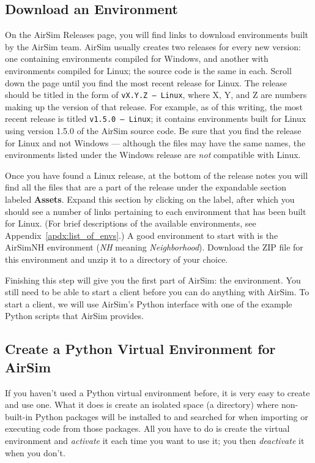 \subsection{Download an Environment}
On the AirSim Releases page, you will find links to download environments built by the AirSim team. AirSim usually creates two releases for every new version: one containing environments compiled for Windows, and another with environments compiled for Linux; the source code is the same in each. Scroll down the page until you find the most recent release for Linux. The release should be titled in the form of \texttt{vX.Y.Z --- Linux}, where X, Y, and Z are numbers making up the version of that release. For example, as of this writing, the most recent release is titled \texttt{v1.5.0 --- Linux}; it contains environments built for Linux using version 1.5.0 of the AirSim source code. Be sure that you find the release for Linux and not Windows --- although the files may have the same names, the environments listed under the Windows release are \textit{not} compatible with Linux.

Once you have found a Linux release, at the bottom of the release notes you will find all the files that are a part of the release under the expandable section labeled \textbf{Assets}. Expand this section by clicking on the label, after which you should see a number of links pertaining to each environment that has been built for Linux. (For brief descriptions of the available environments, see Appendix~\ref{apdx:list_of_envs}.) A good environment to start with is the AirSimNH environment (\textit{NH} meaning \textit{Neighborhood}). Download the ZIP file for this environment and unzip it to a directory of your choice.

Finishing this step will give you the first part of AirSim: the environment. You still need to be able to start a client before you can do anything with AirSim. To start a client, we will use AirSim's Python interface with one of the example Python scripts that AirSim provides.

\subsection{Create a Python Virtual Environment for AirSim}\label{sec:virtual_env}
If you haven't used a Python virtual environment before, it is very easy to create and use one. What it does is create an isolated space (a directory) where non-built-in Python packages will be installed to and searched for when importing or executing code from those packages. All you have to do is create the virtual environment and \textit{activate} it each time you want to use it; you then \textit{deactivate} it when you don't.

